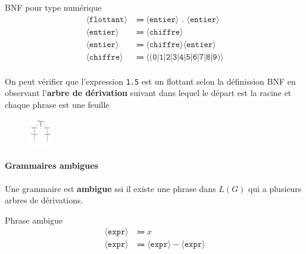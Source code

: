\documentclass{report}
\begin{document}
\begin{multicols*}{3}
    \begin{EExample}{BNF pour type numérique}{}
        \begin{align*}
            \langle \texttt{flottant}   \rangle &\Coloneqq \langle\texttt{entier}\rangle \texttt{ . }  \langle \texttt{entier}   \rangle \\
            \langle \texttt{entier}   \rangle &\Coloneqq \langle\texttt{chiffre}\rangle \\ 
            \langle \texttt{entier}   \rangle &\Coloneqq \langle\texttt{chiffre}\rangle \langle\texttt{entier}\rangle \\
            \langle \texttt{chiffre}   \rangle &\Coloneqq \langle\texttt{(0|1|2|3|4|5|6|7|8|9)}\rangle \\
        \end{align*}
    \end{EExample}

    On peut vérifier que l'expression \texttt{1.5} est un flottant selon la définission BNF en 
    observant l'\textbf{arbre de dérivation} suivant dans lequel le départ est la racine et chaque phrase est une feuille

    \begin{figure}[H]
        \begin{center}
            \includegraphics[width=0.10\textwidth]{expression1point5.png}
        \end{center}
    \end{figure}
    \columnbreak

    \paragraph{Grammaires ambigues}
    Une grammaire est \textbf{ambigue} ssi il existe une phrase dans $L(G)$ qui a plusieurs 
    arbres de dérivations. 

    \begin{EExample}{Phrase ambigue}{}
        \begin{align*}
            \langle \texttt{expr} \rangle  &\Coloneqq x \\
            \langle \texttt{expr} \rangle &\Coloneqq \langle \texttt{expr}   \rangle - \langle \texttt{expr}   \rangle
        \end{align*}
    \end{EExample}


\end{multicols*}
\end{document}
